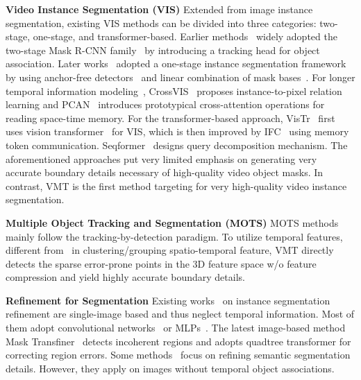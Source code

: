 \documentclass[runningheads]{llncs}
\newcommand{\parsection}[1]{\textbf{#1} }
\begin{document}
\parsection{Video Instance Segmentation (VIS)} Extended from image instance segmentation, existing VIS methods can be divided into three categories: two-stage, one-stage, and transformer-based. Earlier methods~\cite{yang2019video,bertasius2020classifying,lin2020video} widely adopted the two-stage Mask R-CNN family~\cite{he2017mask,huang2019mask,ke2021bcnet} by introducing a tracking head for object association. Later works~\cite{CaoSipMask_ECCV_2020,STMask-CVPR2021,liu2021sg} adopted a one-stage instance segmentation framework by using anchor-free detectors~\cite{tian2019fcos} and linear combination of mask bases~\cite{yolact-iccv2019}. For longer temporal information modeling~\cite{lin2021video}, CrossVIS~\cite{Yang_2021_ICCV} proposes instance-to-pixel relation learning and PCAN~\cite{pcan} introduces prototypical cross-attention operations for reading space-time memory. For the transformer-based approach, VisTr~\cite{wang2020end} first uses vision transformer~\cite{carion2020end} for VIS, which is then improved by IFC~\cite{hwang2021video} using memory token communication. Seqformer~\cite{wu2021seqformer} designs query decomposition mechanism. The aforementioned approaches put very limited emphasis on generating very accurate boundary details necessary of high-quality video object masks. In contrast, VMT is the first method targeting for very high-quality video instance segmentation. 

\parsection{Multiple Object Tracking and Segmentation (MOTS)} MOTS methods~\cite{voigtlaender2019mots,milan2015joint,meinhardt2021trackformer} mainly follow the tracking-by-detection paradigm. To utilize temporal features, different from~\cite{Athar_Mahadevan20ECCV,pcan} in clustering/grouping spatio-temporal feature, VMT directly detects the sparse error-prone points in the 3D feature space w/o feature compression and yield highly accurate boundary details. 


\parsection{Refinement for Segmentation} Existing works~\cite{kirillov2020pointrend,tang2021look} on instance segmentation refinement are single-image based and thus neglect temporal information. Most of them adopt convolutional networks~\cite{tang2021look} or MLPs~\cite{kirillov2020pointrend}. 
The latest image-based method Mask Transfiner~\cite{transfiner} detects incoherent regions and adopts quadtree transformer for correcting  region errors. Some methods~\cite{takikawa2019gated,cheng2020cascadepsp,ding2019boundary,wang2020deep,yuan2020segfix} focus on refining semantic segmentation details. However, they apply on images without temporal object associations. 
\end{document}
